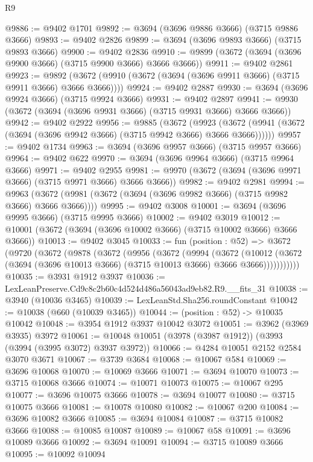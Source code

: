 \begin{lexlean}{R9}
\begin{coremodule}
@9886 := @9402 @1701
@9892 := @3694 (@3696 @9886 @3666) (@3715 @9886 @3666)
@9893 := @9402 @2826
@9899 := @3694 (@3696 @9893 @3666) (@3715 @9893 @3666)
@9900 := @9402 @2836
@9910 := @9899 (@3672 (@3694 (@3696 @9900 @3666) (@3715 @9900 @3666) @3666 @3666))
@9911 := @9402 @2861
@9923 := @9892 (@3672 (@9910 (@3672 (@3694 (@3696 @9911 @3666) (@3715 @9911 @3666) @3666 @3666))))
@9924 := @9402 @2887
@9930 := @3694 (@3696 @9924 @3666) (@3715 @9924 @3666)
@9931 := @9402 @2897
@9941 := @9930 (@3672 (@3694 (@3696 @9931 @3666) (@3715 @9931 @3666) @3666 @3666))
@9942 := @9402 @2922
@9956 := @9885
    (@3672
      (@9923 (@3672 (@9941 (@3672 (@3694 (@3696 @9942 @3666) (@3715 @9942 @3666) @3666 @3666))))))
@9957 := @9402 @1734
@9963 := @3694 (@3696 @9957 @3666) (@3715 @9957 @3666)
@9964 := @9402 @622
@9970 := @3694 (@3696 @9964 @3666) (@3715 @9964 @3666)
@9971 := @9402 @2955
@9981 := @9970 (@3672 (@3694 (@3696 @9971 @3666) (@3715 @9971 @3666) @3666 @3666))
@9982 := @9402 @2981
@9994 := @9963 (@3672 (@9981 (@3672 (@3694 (@3696 @9982 @3666) (@3715 @9982 @3666) @3666 @3666))))
@9995 := @9402 @3008
@10001 := @3694 (@3696 @9995 @3666) (@3715 @9995 @3666)
@10002 := @9402 @3019
@10012 := @10001 (@3672 (@3694 (@3696 @10002 @3666) (@3715 @10002 @3666) @3666 @3666))
@10013 := @9402 @3045
@10033 := fun (position : @52) =>
  @3672
    (@9720
      (@3672
        (@9878
          (@3672
            (@9956
              (@3672
                (@9994
                  (@3672
                    (@10012
                      (@3672 (@3694 (@3696 @10013 @3666) (@3715 @10013 @3666) @3666 @3666)))))))))))
@10035 := @3931 @1912 @3937
@10036 := LexLeanPreserve.Cd9c8c2b60c4d524d486a56043ad9eb82.R9.__fits_31
@10038 := @3940 (@10036 @3465)
@10039 := LexLeanStd.Sha256.roundConstant
@10042 := @10038 (@660 (@10039 @3465))
@10044 := (position : @52) -> @10035 @10042
@10048 := @3954 @1912 @3937 @10042 @3072
@10051 := @3962 (@3969 @3935) @3972
@10061 := @10048 @10051 (@3978 (@3987 @1912)) (@3993 (@3994 (@3995 @3072) @3937 @3972))
@10066 := @4284 @10051 @2152 @2584 @3070 @3671
@10067 := @3739 @3684
@10068 := @10067 @584
@10069 := @3696 @10068
@10070 := @10069 @3666
@10071 := @3694 @10070
@10073 := @3715 @10068 @3666
@10074 := @10071 @10073
@10075 := @10067 @295
@10077 := @3696 @10075 @3666
@10078 := @3694 @10077
@10080 := @3715 @10075 @3666
@10081 := @10078 @10080
@10082 := @10067 @200
@10084 := @3696 @10082 @3666
@10085 := @3694 @10084
@10087 := @3715 @10082 @3666
@10088 := @10085 @10087
@10089 := @10067 @58
@10091 := @3696 @10089 @3666
@10092 := @3694 @10091
@10094 := @3715 @10089 @3666
@10095 := @10092 @10094

\end{coremodule}
\end{lexlean}
